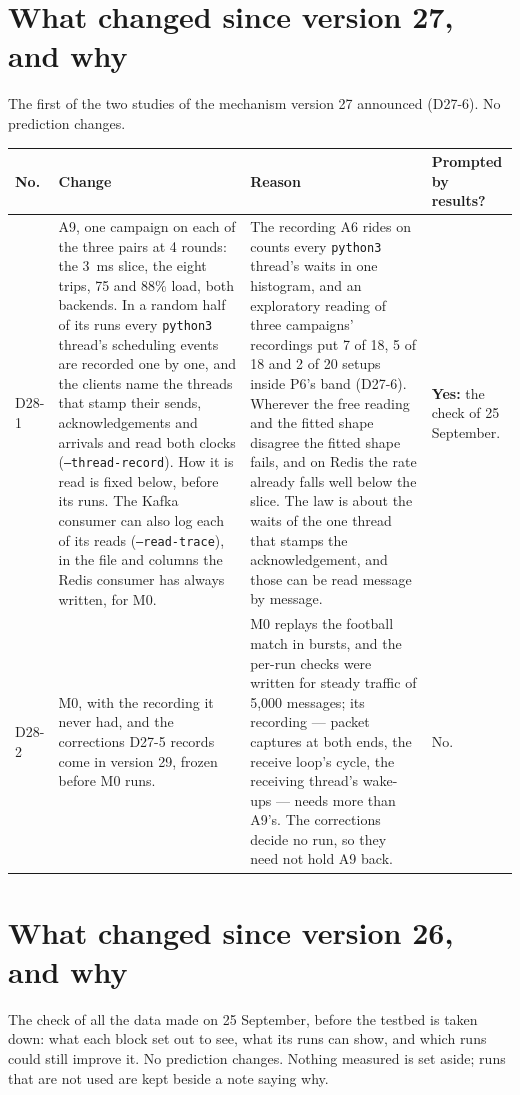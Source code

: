 \documentclass[11pt]{article}
\begin{document}
\section*{What changed since version 27, and why}
The first of the two studies of the mechanism version 27 announced (D27-6). No prediction
changes.

{\small
\begin{longtable}{@{}p{1.1cm} >{\raggedright\arraybackslash}p{6.1cm} >{\raggedright\arraybackslash}p{6.0cm} >{\raggedright\arraybackslash}p{2.2cm}@{}}
\toprule
\textbf{No.} & \textbf{Change} & \textbf{Reason} & \textbf{Prompted by results?} \\
\midrule
\endhead
D28-1 & A9, one campaign on each of the three pairs at 4 rounds: the 3~ms slice, the eight trips, 75 and 88\% load, both backends. In a random half of its runs every \texttt{python3} thread's scheduling events are recorded one by one, and the clients name the threads that stamp their sends, acknowledgements and arrivals and read both clocks (\texttt{--thread-record}). How it is read is fixed below, before its runs. The Kafka consumer can also log each of its reads (\texttt{--read-trace}), in the file and columns the Redis consumer has always written, for M0. & The recording A6 rides on counts every \texttt{python3} thread's waits in one histogram, and an exploratory reading of three campaigns' recordings put 7 of 18, 5 of 18 and 2 of 20 setups inside P6's band (D27-6). Wherever the free reading and the fitted shape disagree the fitted shape fails, and on Redis the rate already falls well below the slice. The law is about the waits of the one thread that stamps the acknowledgement, and those can be read message by message. & \textbf{Yes:} the check of 25 September. \\
D28-2 & M0, with the recording it never had, and the corrections D27-5 records come in version 29, frozen before M0 runs. & M0 replays the football match in bursts, and the per-run checks were written for steady traffic of 5,000 messages; its recording --- packet captures at both ends, the receive loop's cycle, the receiving thread's wake-ups --- needs more than A9's. The corrections decide no run, so they need not hold A9 back. & No. \\
\bottomrule
\end{longtable}}

\section*{What changed since version 26, and why}
The check of all the data made on 25 September, before the testbed is taken down: what each
block set out to see, what its runs can show, and which runs could still improve it. No
prediction changes. Nothing measured is set aside; runs that are not used are kept beside a
note saying why.
\end{document}
